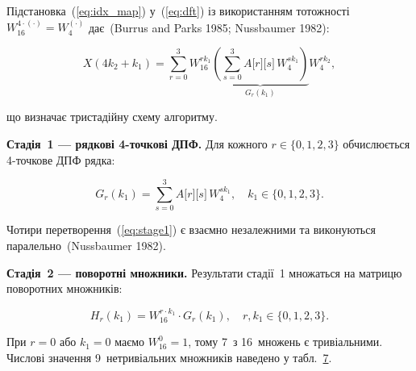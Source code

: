 Підстановка~(\hyperref[eq:idx_map]{{[}eq:idx\_map{]}})
у~(\hyperref[eq:dft]{{[}eq:dft{]}}) із використанням тотожності
\(W_{16}^{4 \cdot ( \cdot )} = W_{4}^{( \cdot )}\) дає~(Burrus and Parks
1985; Nussbaumer 1982):

\[X(4k_{2} + k_{1}) = \sum_{r = 0}^{3}W_{16}^{rk_{1}}\underset{G_{r}(k_{1})}{\underbrace{\left( \sum_{s = 0}^{3}A\lbrack r\rbrack\lbrack s\rbrack\, W_{4}^{sk_{1}} \right)}}W_{4}^{rk_{2}},\]

що визначає тристадійну схему алгоритму.

\textbf{Стадія~1 --- рядкові 4-точкові ДПФ.} Для кожного
\(r \in \{ 0,1,2,3\}\) обчислюється 4-точкове ДПФ рядка:

\[G_{r}(k_{1}) = \sum_{s = 0}^{3}A\lbrack r\rbrack\lbrack s\rbrack\, W_{4}^{sk_{1}},\quad k_{1} \in \{ 0,1,2,3\}.\]

Чотири перетворення~(\hyperref[eq:stage1]{{[}eq:stage1{]}}) є взаємно
незалежними та виконуються паралельно~(Nussbaumer 1982).

\textbf{Стадія~2 --- поворотні множники.} Результати стадії~1 множаться
на матрицю поворотних множників:

\[H_{r}(k_{1}) = W_{16}^{r \cdot k_{1}} \cdot G_{r}(k_{1}),\quad r,k_{1} \in \{ 0,1,2,3\}.\]

При \(r = 0\) або \(k_{1} = 0\) маємо \(W_{16}^{0} = 1\), тому 7~з
16~множень є тривіальними. Числові значення 9~нетривіальних множників
наведено у табл.~\hyperref[tab:twiddle]{7}.

